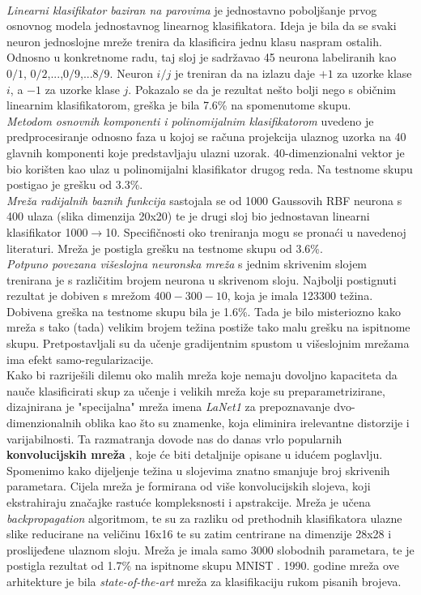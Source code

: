 \documentclass[times, utf8, diplomski]{fer}
\theoremstyle{definition}
\begin{document}
\\
\textit{Linearni klasifikator baziran na parovima}  je jednostavno poboljšanje prvog osnovnog modela jednostavnog linearnog klasifikatora. Ideja je bila da se svaki neuron jednoslojne mreže trenira da klasificira jednu klasu naspram ostalih. Odnosno u konkretnome radu, taj sloj je sadržavao 45 neurona labeliranih kao $0/1$, $0/2$,...,$0/9$,...$8/9$. Neuron $i/j$ je treniran da na izlazu daje $+1$ za uzorke klase $i$, a $-1$ za uzorke klase $j$. Pokazalo se da je rezultat nešto bolji nego s običnim linearnim klasifikatorom, greška je bila 7.6\% na spomenutome skupu.
\\
\textit{Metodom osnovnih komponenti i polinomijalnim klasifikatorom}  uvedeno je predprocesiranje odnosno faza u kojoj se računa projekcija ulaznog uzorka na 40 glavnih komponenti koje predstavljaju ulazni uzorak. 40-dimenzionalni vektor je bio korišten kao ulaz u polinomijalni klasifikator drugog reda. Na testnome skupu postigao je grešku od 3.3\%.
\\
\textit{Mreža radijalnih baznih funkcija }  sastojala se od 1000 Gaussovih RBF neurona s 400 ulaza (slika dimenzija 20x20) te je drugi sloj bio jednostavan linearni klasifikator 1000$\rightarrow$10. Specifičnosti oko treniranja mogu se pronaći u navedenoj literaturi. Mreža je postigla grešku na testnome skupu od 3.6\%.
\\
\textit{Potpuno povezana višeslojna neuronska mreža}  s jednim skrivenim slojem trenirana je s različitim brojem neurona u skrivenom sloju. Najbolji postignuti rezultat je dobiven s mrežom $400-300-10$,  koja je imala 123300 težina. Dobivena greška na testnome skupu bila je 1.6\%. Tada je bilo misteriozno kako mreža s tako (tada) velikim brojem težina postiže tako malu grešku na ispitnome skupu. Pretpostavljali su da učenje gradijentnim spustom u višeslojnim mrežama ima efekt samo-regularizacije.
\\
Kako bi razriješili dilemu oko malih mreža koje nemaju dovoljno kapaciteta da nauče klasificirati skup za učenje i velikih mreža koje su preparametrizirane, dizajnirana je "specijalna" mreža imena \textit{LaNet1} za prepoznavanje dvo-dimenzionalnih oblika kao što su znamenke, koja eliminira irelevantne distorzije i varijabilnosti. Ta razmatranja dovode nas do danas vrlo popularnih \textbf{konvolucijskih mreža} \cite{NIPS1989_293}, koje će biti detaljnije opisane u idućem poglavlju. Spomenimo kako dijeljenje težina u slojevima znatno smanjuje broj skrivenih parametara. Cijela mreža je formirana od više konvolucijskih slojeva, koji ekstrahiraju značajke rastuće kompleksnosti i apstrakcije. Mreža je učena \textit{backpropagation} algoritmom, te su za razliku od prethodnih klasifikatora ulazne slike reducirane na veličinu 16x16 te su zatim centrirane na dimenzije 28x28 i proslijeđene ulaznom sloju. Mreža je imala samo 3000 slobodnih parametara, te je postigla rezultat od 1.7\% na ispitnome skupu MNIST	. 1990. godine mreža ove arhitekture je bila \textit{state-of-the-art} mreža za klasifikaciju rukom pisanih brojeva.
\end{document}
